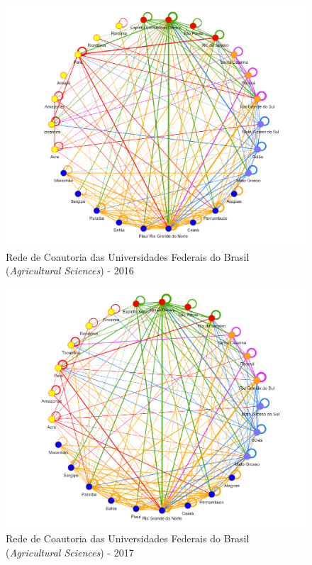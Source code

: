 \begin{figure}[H]
	\centering
	\includegraphics[scale=0.6]{Imagens/rede-agr-br-2016.pdf}
	\caption{Rede de Coautoria das Universidades Federais do Brasil (\textit{Agricultural Sciences}) - 2016}
	\label{Rede de Coautoria - UF AGRI BR 2016}
\end{figure}

\begin{figure}[H]
	\centering
	\includegraphics[scale=0.6]{Imagens/rede-agr-br-2017.pdf}
	\caption{Rede de Coautoria das Universidades Federais do Brasil (\textit{Agricultural Sciences}) - 2017}
	\label{Rede de Coautoria - UF AGRI BR 2017}
\end{figure}

